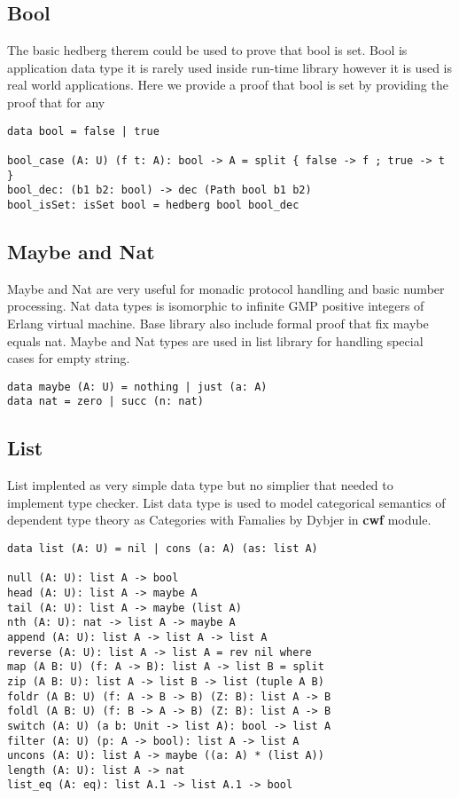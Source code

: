 \documentclass{article}
\begin{document}
\subsection{Bool}

The basic hedberg therem could be used to prove that bool is set.
Bool is application data type it is rarely used inside run-time library
however it is used is real world applications. Here we provide a proof
that bool is set by providing the proof that for any

\begin{lstlisting}[mathescape=true]
data bool = false | true

bool_case (A: U) (f t: A): bool -> A = split { false -> f ; true -> t }
bool_dec: (b1 b2: bool) -> dec (Path bool b1 b2)
bool_isSet: isSet bool = hedberg bool bool_dec
\end{lstlisting}

\subsection{Maybe and Nat}

Maybe and Nat are very useful for monadic protocol handling
and basic number processing. Nat data types is isomorphic
to infinite GMP positive integers of Erlang virtual machine.
Base library also include formal proof that fix maybe equals nat.
Maybe and Nat types are used in list library for handling special cases
for empty string.

\begin{lstlisting}[mathescape=true]
data maybe (A: U) = nothing | just (a: A)
data nat = zero | succ (n: nat)
\end{lstlisting}

\subsection{List}

List implented as very simple data type but no simplier
that needed to implement type checker. List data type is
used to model categorical semantics of dependent type theory
as Categories with Famalies by Dybjer in {\bf cwf} module.

\begin{lstlisting}[mathescape=true]
data list (A: U) = nil | cons (a: A) (as: list A)

null (A: U): list A -> bool
head (A: U): list A -> maybe A
tail (A: U): list A -> maybe (list A)
nth (A: U): nat -> list A -> maybe A
append (A: U): list A -> list A -> list A
reverse (A: U): list A -> list A = rev nil where
map (A B: U) (f: A -> B): list A -> list B = split
zip (A B: U): list A -> list B -> list (tuple A B)
foldr (A B: U) (f: A -> B -> B) (Z: B): list A -> B
foldl (A B: U) (f: B -> A -> B) (Z: B): list A -> B
switch (A: U) (a b: Unit -> list A): bool -> list A
filter (A: U) (p: A -> bool): list A -> list A
uncons (A: U): list A -> maybe ((a: A) * (list A))
length (A: U): list A -> nat
list_eq (A: eq): list A.1 -> list A.1 -> bool
\end{lstlisting}
\end{document}
